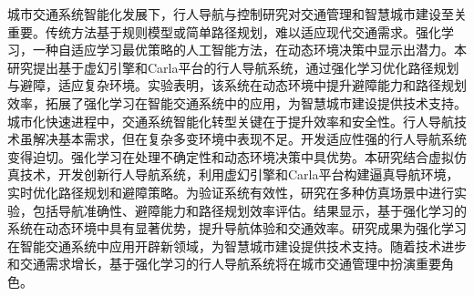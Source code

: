 \begin{abstractzh}

城市交通系统智能化发展下，行人导航与控制研究对交通管理和智慧城市建设至关重要。传统方法基于规则模型或简单路径规划，难以适应现代交通需求。强化学习，一种自适应学习最优策略的人工智能方法，在动态环境决策中显示出潜力。本研究提出基于虚幻引擎和Carla平台的行人导航系统，通过强化学习优化路径规划与避障，适应复杂环境。实验表明，该系统在动态环境中提升避障能力和路径规划效率，拓展了强化学习在智能交通系统中的应用，为智慧城市建设提供技术支持。城市化快速进程中，交通系统智能化转型关键在于提升效率和安全性。行人导航技术虽解决基本需求，但在复杂多变环境中表现不足。开发适应性强的行人导航系统变得迫切。强化学习在处理不确定性和动态环境决策中具优势。本研究结合虚拟仿真技术，开发创新行人导航系统，利用虚幻引擎和Carla平台构建逼真导航环境，实时优化路径规划和避障策略。为验证系统有效性，研究在多种仿真场景中进行实验，包括导航准确性、避障能力和路径规划效率评估。结果显示，基于强化学习的系统在动态环境中具有显著优势，提升导航体验和交通效率。研究成果为强化学习在智能交通系统中应用开辟新领域，为智慧城市建设提供技术支持。随着技术进步和交通需求增长，基于强化学习的行人导航系统将在城市交通管理中扮演重要角色。

\end{abstractzh}
